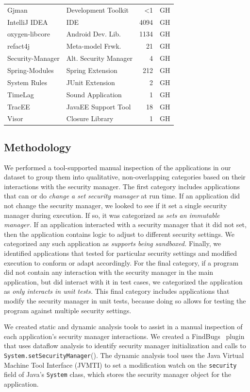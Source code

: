 \documentclass{sig-alternate}
\begin{document}
\begin{table}
\begin{tabular}{llrl}
Gjman & Development Toolkit & <1 & GH\tabularnewline
IntelliJ IDEA & IDE & 4094 & GH\tabularnewline
oxygen-libcore & Android Dev. Lib. & 1134 & GH\tabularnewline
refact4j & Meta-model Frwk. & 21 & GH\tabularnewline
Security-Manager & Alt. Security Manager & 4 & GH\tabularnewline
Spring-Modules & Spring Extension & 212 & GH\tabularnewline
System Rules & JUnit Extension & 2 & GH\tabularnewline
TimeLag & Sound Application & 1 & GH\tabularnewline
TracEE & JavaEE Support Tool & 18 & GH\tabularnewline
Visor & Closure Library & 1 & GH\tabularnewline
\bottomrule
\end{tabular}
\end{table}

\subsection{Methodology}
\label{sec:methodology}

We performed a tool-supported manual inspection of the applications in our
dataset to group them
into qualitative, non-overlapping categories based on their interactions with the security 
manager. The first category includes applications that can or do
\emph{change a set security manager} at run time.
If an application did not change the security manager, 
we looked to see if it set a single security manager 
during execution.  If so, it
was categorized as \emph{sets an immutable manager.}  If an
application interacted with a security manager that it did not set, 
then the application contains logic to adjust to different security settings.
We categorized any such application
as \emph{supports being sandboxed.}  Finally, we identified
applications that tested for particular security settings and modified execution
to conform or adapt accordingly.
For the final category, if a
program did not contain any interaction with the security manager in 
the main application, but did interact with it
in test cases, we categorized the
application as \emph{only interacts in unit tests.}  This final category
includes applications that modify the security manager in unit tests, because doing
so allows for testing the program against multiple security settings.

We created static and dynamic analysis tools
to assist in a manual inspection of each application's security manager
interactions. We created a 
FindBugs~\cite{hovemeyer_finding_2004} plugin that
uses dataflow analysis to identify security manager initialization and calls to \texttt{System.setSecurityManager}().
The dynamic analysis tool uses the Java Virtual Machine
Tool Interface (JVMTI) \cite{_jvmti} to set a modification watch
on the \texttt{security} field of Java's \texttt{System} class, which
stores the security manager object for the application.
\end{document}
